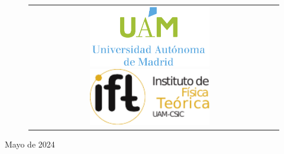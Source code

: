 \begin{figure}[ht]
\centering
\begin{tabular}{cc}
\includegraphics[height=2.7cm]{LogoUAMvertical.png}\qquad\qquad
\includegraphics[height=2.5cm]{LogoIFT.pdf}
%
%
%
\end{tabular}
\end{figure}

\vspace{0.5cm}



\begin{center}
{\large Mayo de 2024}
\end{center}




\newpage


\newpage
\thispagestyle{empty}
\phantom{lala}




\cleardoublepage



